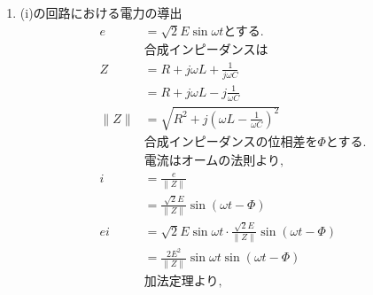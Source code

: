 \documentclass[twocolumn]{article}
\begin{document}
\begin{enumerate}
  \item (i)の回路における電力の導出
        \begin{align*}
          e               & = \sqrt{2}E\sin\omega t\text{とする.}                                                                                                       \\
                          & \text{合成インピーダンスは}                                                                                                                        \\
          Z               & = R + j\omega L + \frac{1}{j\omega C}                                                                                                    \\
                          & = R + j\omega L -j \frac{1}{\omega C}                                                                                                    \\
          \|Z\|           & = \sqrt{R^2 + j{\left(\omega L - \frac{1}{\omega C}\right)}^2}                                                                           \\
                          & \text{合成インピーダンスの位相差を}\Phi\text{とする.}                                                                                                     \\
                          & \text{電流はオームの法則より,}                                                                                                                      \\
          i               & = \frac{e}{\|Z\|}                                                                                                                        \\
                          & = \frac{\sqrt{2}E}{\|Z\|}\sin \left(\omega t - \Phi\right)                                                                               \\
          ei              & = \sqrt{2}E\sin\omega t \cdot \frac{\sqrt{2}E}{\|Z\|}\sin \left(\omega t - \Phi\right)                                                   \\
                          & = \frac{2E^2}{\|Z\|}\sin\omega t  \sin \left(\omega t - \Phi\right)                                                                      \\
                          & \text{加法定理より,}                                                                                                                           \\

\end{align*}
\end{enumerate}
\end{document}
